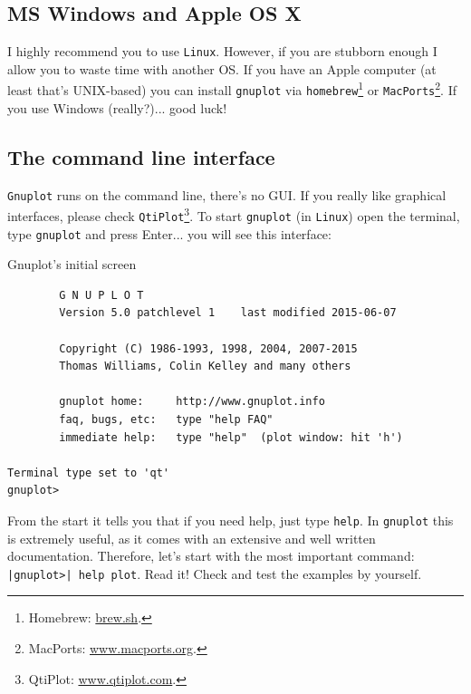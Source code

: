 \subsection*{MS Windows and Apple OS X}

I highly recommend you to use \texttt{Linux}. However, if you are stubborn enough I allow you to waste time with another OS. If you have an Apple computer (at least that's UNIX-based) you can install \texttt{gnuplot} via \texttt{homebrew}\footnote{Homebrew: \url{brew.sh}.} or \texttt{MacPorts}\footnote{MacPorts: \url{www.macports.org}.}. If you use Windows (really?)... good luck!


\subsection{The command line interface}

\texttt{Gnuplot} runs on the command line, there's no GUI. If you really like graphical interfaces, please check \texttt{QtiPlot}\footnote{QtiPlot: \url{www.qtiplot.com}.}. To start \texttt{gnuplot} (in \texttt{Linux}) open the terminal, type \texttt{gnuplot} and press Enter... you will see this interface:

\begin{example}{Gnuplot's initial screen}
\begin{verbatim}
        G N U P L O T                                                                                                             
        Version 5.0 patchlevel 1    last modified 2015-06-07                                                                      
                                                                                                                                  
        Copyright (C) 1986-1993, 1998, 2004, 2007-2015                                                                                
        Thomas Williams, Colin Kelley and many others

        gnuplot home:     http://www.gnuplot.info
        faq, bugs, etc:   type "help FAQ"
        immediate help:   type "help"  (plot window: hit 'h')

Terminal type set to 'qt'
gnuplot> 
\end{verbatim}
\end{example}

From the start it tells you that if you need help, just type \texttt{help}. In \texttt{gnuplot} this is extremely useful, as it comes with an extensive and well written documentation. Therefore, let's start with the most important command: \texttt{|gnuplot>| help plot}. Read it! Check and test the examples by yourself.

